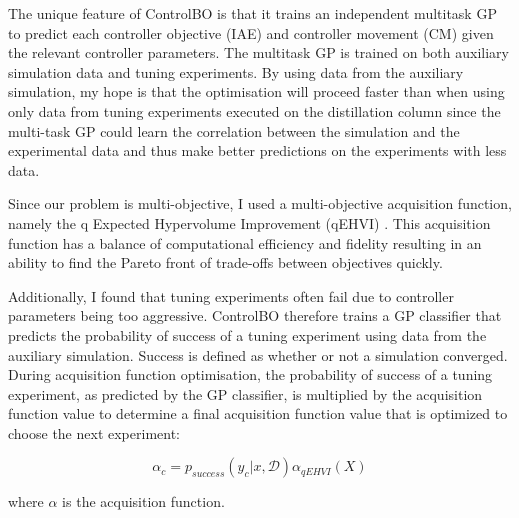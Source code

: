 The unique feature of ControlBO is that it trains an independent multitask GP to predict each controller objective (IAE) and controller movement (CM) given the relevant controller parameters. The multitask GP is trained on both auxiliary simulation data and tuning experiments. By using data from the auxiliary simulation, my hope is that the optimisation will proceed faster than when using only data from tuning experiments executed on the distillation column since the multi-task GP could learn the correlation between the simulation and the experimental data and thus make better predictions on the experiments with less data.

Since our problem is multi-objective, I used a multi-objective acquisition function, namely the q Expected Hypervolume Improvement (qEHVI) \cite{Balandat2020}. This acquisition function has a balance of computational efficiency and fidelity resulting in an ability to find the Pareto front of trade-offs between objectives quickly. 

Additionally, I found that tuning experiments often fail due to controller parameters being too aggressive. ControlBO therefore trains a GP classifier that predicts the probability of success of a tuning experiment using data from the auxiliary simulation. Success is defined as whether or not a simulation converged. During acquisition function optimisation, the probability of success of a tuning experiment, as predicted by the GP classifier, is multiplied by the acquisition function value to determine a final acquisition function value that is optimized to choose the next experiment:

\begin{equation}
    \alpha_{c} = p_{success}(y_c \vert x, \mathcal D) \alpha_{qEHVI}(X)
\end{equation}

where $\alpha$ is the acquisition function.
 




